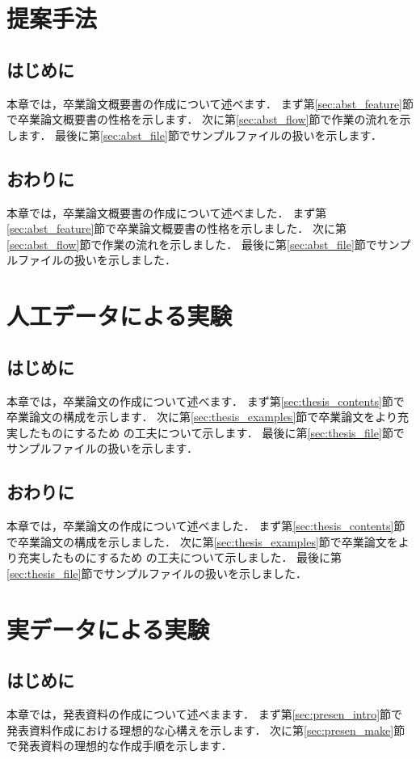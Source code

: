 \documentclass[a4j,12pt,dvipdfmx,oneside]{jsbook}
\theoremstyle{definition}
\begin{document}
\chapter{提案手法}\label{chap:suggest_method}
%
\section{はじめに}\label{sec:suggest_method_intro}
本章では，卒業論文概要書の作成について述べます．
まず第\ref{sec:abst_feature}節で卒業論文概要書の性格を示します．
次に第\ref{sec:abst_flow}節で作業の流れを示します．
最後に第\ref{sec:abst_file}節でサンプルファイルの扱いを示します．
%
\section{おわりに}\label{sec:suggest_method_summary}
本章では，卒業論文概要書の作成について述べました．
まず第\ref{sec:abst_feature}節で卒業論文概要書の性格を示しました．
次に第\ref{sec:abst_flow}節で作業の流れを示しました．
最後に第\ref{sec:abst_file}節でサンプルファイルの扱いを示しました．
%
%
%
\chapter{人工データによる実験}\label{chap:artificial_data}
%
\section{はじめに}\label{sec:artificial_data_intro}
本章では，卒業論文の作成について述べます．
まず第\ref{sec:thesis_contents}節で卒業論文の構成を示します．
次に第\ref{sec:thesis_examples}節で卒業論文をより充実したものにするため
の工夫について示します．
最後に第\ref{sec:thesis_file}節でサンプルファイルの扱いを示します．
%
\section{おわりに}\label{sec:artificial_data_summary}
本章では，卒業論文の作成について述べました．
まず第\ref{sec:thesis_contents}節で卒業論文の構成を示しました．
次に第\ref{sec:thesis_examples}節で卒業論文をより充実したものにするため
の工夫について示しました．
最後に第\ref{sec:thesis_file}節でサンプルファイルの扱いを示しました．
%
%
%
\chapter{実データによる実験}\label{chap:real_data}
%
\section{はじめに}\label{sec:real_data_presen}
本章では，発表資料の作成について述べまます．
まず第\ref{sec:presen_intro}節で発表資料作成における理想的な心構えを示します．
次に第\ref{sec:presen_make}節で発表資料の理想的な作成手順を示します．
%
\end{document}
